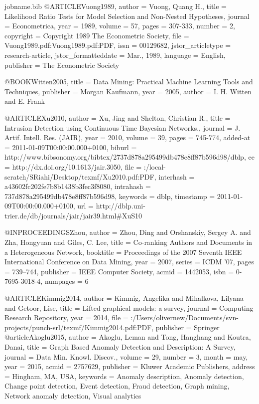 {\begin{filecontents*}{jobname.bib}
	@ARTICLE{Vuong1989,
		author = {Vuong, Quang H.},
		title = {Likelihood Ratio Tests for Model Selection and Non-Nested Hypotheses},
		journal = {Econometrica},
		year = {1989},
		volume = {57},
		pages = {307-333},
		number = {2},
		copyright = {Copyright 1989 The Econometric Society},
		file = {Vuong1989.pdf:Vuong1989.pdf:PDF},
		issn = {00129682},
		jstor_articletype = {research-article},
		jstor_formatteddate = {Mar., 1989},
		language = {English},
		publisher = {The Econometric Society}
	}
	
	@BOOK{Witten2005,
		title = {Data Mining: Practical Machine Learning Tools and Techniques},
		publisher = {Morgan Kaufmann},
		year = {2005},
		author = {I. H. Witten and E. Frank}
	}
	
	@ARTICLE{Xu2010,
		author = {Xu, Jing and Shelton, Christian R.},
		title = {Intrusion Detection using Continuous Time Bayesian Networks.},
		journal = {J. Artif. Intell. Res. (JAIR)},
		year = {2010},
		volume = {39},
		pages = {745-774},
		added-at = {2011-01-09T00:00:00.000+0100},
		biburl = {http://www.bibsonomy.org/bibtex/2737d878a295499db478e8ff87b596d98/dblp},
		ee = {http://dx.doi.org/10.1613/jair.3050},
		file = {:/local-scratch/SRiahi/Desktop/texmf/Xu2010.pdf:PDF},
		interhash = {a43602fc202fe7b8b1438b3fec3f8080},
		intrahash = {737d878a295499db478e8ff87b596d98},
		keywords = {dblp},
		timestamp = {2011-01-09T00:00:00.000+0100},
		url = {http://dblp.uni-trier.de/db/journals/jair/jair39.html#XuS10}
	}
	
	@INPROCEEDINGS{Zhou,
		author = {Zhou, Ding and Orshanskiy, Sergey A. and Zha, Hongyuan and Giles,
			C. Lee},
		title = {Co-ranking Authors and Documents in a Heterogeneous Network},
		booktitle = {Proceedings of the 2007 Seventh IEEE International Conference on
			Data Mining},
		year = {2007},
		series = {ICDM '07},
		pages = {739--744},
		publisher = {IEEE Computer Society},
		acmid = {1442053},
		isbn = {0-7695-3018-4},
		numpages = {6}
	}
	
	@ARTICLE{Kimmig2014,
		author = {Kimmig, Angelika and Mihalkova, Lilyana and Getoor, Lise},
		title = {Lifted graphical models: a survey},
		journal = { Computing Research Repository},
		year = {2014},
		file = {:/Users/olivernew/Documents/svn-projects/punch-srl/texmf/Kimmig2014.pdf:PDF},
		publisher = {Springer}
	}
	@article{Akoglu2015,
		author = {Akoglu, Leman and Tong, Hanghang and Koutra, Danai},
		title = {Graph Based Anomaly Detection and Description: A Survey},
		journal = {Data Min. Knowl. Discov.},
		volume = {29},
		number = {3},
		month = may,
		year = {2015},
		acmid = {2757629},
		publisher = {Kluwer Academic Publishers},
		address = {Hingham, MA, USA},
		keywords = {Anomaly description, Anomaly detection, Change point detection, Event detection, Fraud detection, Graph mining, Network anomaly detection, Visual analytics}
	} 
	

\end{filecontents*}}
